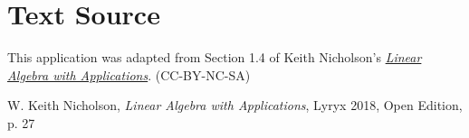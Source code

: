 \documentclass{ximera}
\begin{document}
\section*{Text Source} This application was adapted from Section 1.4 of Keith Nicholson's \href{https://open.umn.edu/opentextbooks/textbooks/linear-algebra-with-applications}{\it Linear Algebra with Applications}. (CC-BY-NC-SA)

W. Keith Nicholson, {\it Linear Algebra with Applications}, Lyryx 2018, Open Edition, p. 27 




\end{document}
